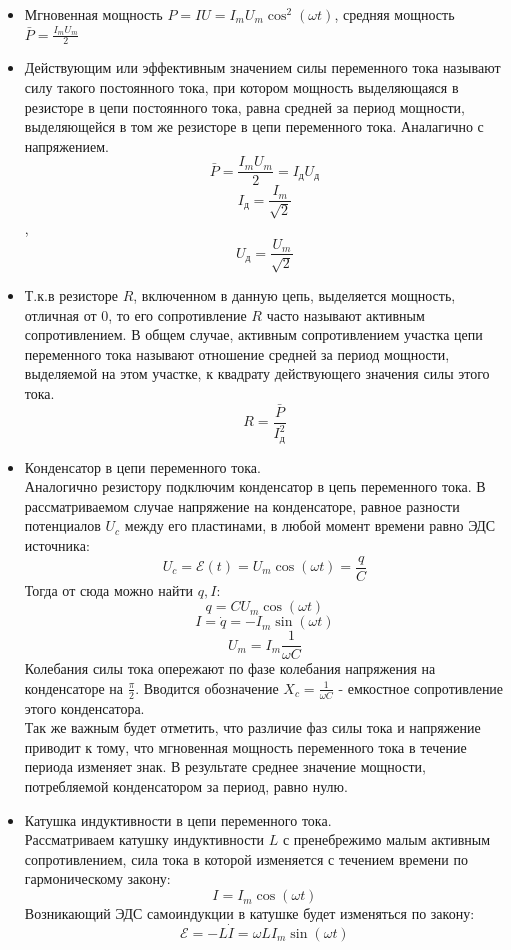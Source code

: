 \documentclass{article}
\begin{document}
\begin{flushleft}
\begin{itemize}
        \item Мгновенная мощность $P = IU = I_m U_m \cos^2(\omega t)$, средняя мощность $\bar{P} = \frac{I_m U_m}{2}$
        \item Действующим или эффективным значением силы переменного тока называют силу такого постоянного тока, при котором мощность выделяющаяся в резисторе в цепи постоянного тока, равна средней за период мощности, выделяющейся в том же резисторе в цепи переменного тока. Аналагично с напряжением.
        \[\bar{P} = \frac{I_m U_m}{2} = I_\text{д} U_\text{д}\] \[I_\text{д} = \frac{I_m}{\sqrt{2}}\], \[U_\text{д} = \frac{U_m}{\sqrt{2}}\]
        \item Т.к.в резисторе $R$, включенном в данную цепь, выделяется мощность, отличная от 0, то его сопротивление $R$ часто называют активным сопротивлением. В общем случае, активным сопротивлением участка цепи переменного тока называют отношение средней за период мощности, выделяемой на этом участке, к квадрату действующего значения силы этого тока. \[R = \frac{\bar{P}}{I^2_\text{д}}\]
        \item Конденсатор в цепи переменного тока. \\Аналогично резистору подключим конденсатор в цепь переменного тока. В рассматриваемом случае напряжение на конденсаторе, равное разности потенциалов $U_c$ между его пластинами, в любой момент времени равно ЭДС источника: \[U_c = \mathcal{E}(t) = U_m \cos(\omega t) = \frac{q}{C}\]
        Тогда от сюда можно найти $q, I:$ \[ q = C U_m \cos(\omega t)\] \[I = \dot q = -I_m \sin(\omega t)\]
        \[U_m = I_m \frac{1}{\omega C}\]
        Колебания силы тока опережают по фазе колебания напряжения на конденсаторе на $\frac{\pi}{2}$.
        Вводится обозначение $X_c = \frac{1}{\omega C}$ - емкостное сопротивление этого конденсатора.
        \\Так же важным будет отметить, что различие фаз силы тока и напряжение приводит к тому, что мгновенная мощность переменного тока в течение периода изменяет знак. В результате среднее значение мощности, потребляемой конденсатором за период, равно нулю.
        \item Катушка индуктивности в цепи переменного тока. \\ Рассматриваем катушку индуктивности $L$ с пренебрежимо малым активным сопротивлением, сила тока в которой изменяется с течением времени по гармоническому закону: \[I = I_m \cos(\omega t)\] Возникающий ЭДС самоиндукции в катушке будет изменяться по закону: \[\mathcal{E} = -L \dot I = \omega LI_m \sin(\omega t)\] 

\end{itemize}
\end{flushleft}
\end{document}
